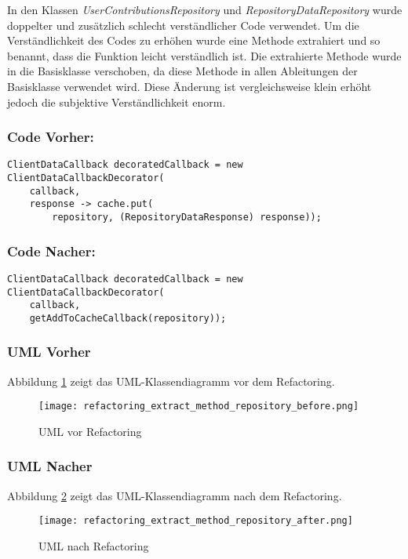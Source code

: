 In den Klassen \textit{UserContributionsRepository} und \textit{RepositoryDataRepository} wurde doppelter und zusätzlich schlecht verständlicher Code verwendet. Um die Verständlichkeit des Codes zu erhöhen wurde eine Methode extrahiert und so benannt, dass die Funktion leicht verständlich ist. Die extrahierte Methode wurde in die Basisklasse verschoben, da diese Methode in allen Ableitungen der Basisklasse verwendet wird. Diese Änderung ist vergleichsweise klein erhöht jedoch die subjektive Verständlichkeit enorm.
\subsubsection*{Code Vorher:}
\begin{lstlisting}[breaklines=false]
ClientDataCallback decoratedCallback = new ClientDataCallbackDecorator(
	callback, 
	response -> cache.put(
		repository, (RepositoryDataResponse) response));
\end{lstlisting}
\subsubsection*{Code Nacher:}
\begin{lstlisting}[breaklines=false]
ClientDataCallback decoratedCallback = new ClientDataCallbackDecorator(
	callback, 
	getAddToCacheCallback(repository));
\end{lstlisting}

\newpage
\subsubsection{UML Vorher}
Abbildung \ref{fig:ExtractMethod_Refactoring_Before} zeigt das UML-Klassendiagramm vor dem Refactoring.
\begin{figure}[h]
  \texttt{[image: refactoring\_extract\_method\_repository\_before.png]}
  \centering
  \caption{UML vor Refactoring}
  \label{fig:ExtractMethod_Refactoring_Before}
\end{figure}

\newpage
\subsubsection{UML Nacher}
Abbildung \ref{fig:ExtractMethod_Refactoring_After} zeigt das UML-Klassendiagramm nach dem Refactoring.
\begin{figure}[h]
  \texttt{[image: refactoring\_extract\_method\_repository\_after.png]}
  \caption{UML nach Refactoring}
  \label{fig:ExtractMethod_Refactoring_After}
\end{figure}
\newpage


